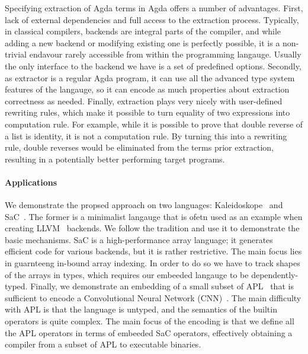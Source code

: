 \documentclass[acmsmall,review,anonymous]{acmart}\settopmatter{printfolios=true,printccs=false,printacmref=false}
\begin{document}
Specifying extraction of Agda terms in Agda offers a number of advantages.  First,
lack of external dependencies and full access to the extraction process.  Typically,
in classical compilers, backends are integral parts of the compiler, and while adding
a new backend or modifying existing one is perfectly possible, it is a non-trivial
endavour rarely accessible
from within the programming langauge.  Usually the only interface to the backend
we have is a set of predefined options.  Secondly, as extractor is a regular Agda
program, it can use all the advanced type system features of the langauge, so it
can encode as much properties about extraction correctness as needed.  Finally,
extraction plays very nicely with user-defined rewriting rules, which make it possible
to turn equality of two expressions into computation rule.  For example, while it
is possible to prove that double reverse of a list is identity, it is not a computation
rule.  By turning this into a rewriting rule, double reverses would be eliminated
from the terms prior extraction, resulting in a potentially better performing
target programs.


\paragraph{Applications} We demonstrate the propsed approach on two languages:
Kaleidoskope~\cite{} and SaC~\cite{}.  The former is a minimalist langauge
that is ofetn used as an example when creating LLVM~\cite{} backends.  We follow
the tradition and use it to demonstrate the basic mechanisms.  SaC is a high-performance
array language; it generates efficient code for various backends, but it is rather
restrictive.  The main focus lies in guarnteeng in-bound array indexing.  In order
to do so we have to track shapes of the arrays in types, which requires our
embeeded langauge to be dependently-typed.  Finally, we demonstrate an embedding
of a small subset of APL~\cite{}
that is sufficient to encode a Convolutional Neural Network (CNN)~\cite{}.
The main difficulty with APL is that the language is untyped, and the semantics
of the builtin operators is quite complex.  The main focus of the encoding is that
we define all the APL operators in terms of embeeded SaC operators, effectively
obtaining a compiler from a subset of APL to executable binaries.
\end{document}
